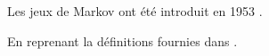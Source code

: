 \documentclass{article}
\begin{document}
Les jeux de Markov ont été introduit en 1953 \citep{abramoff_considerations_2023}.

En reprenant la définitions fournies dans \citet{key2}.


\end{document}
